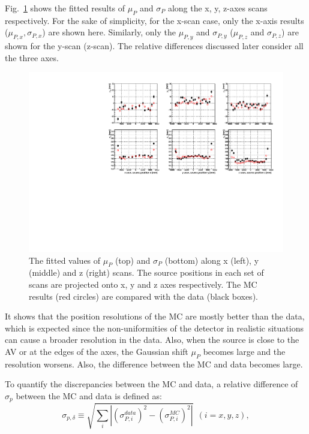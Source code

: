 Fig.~\ref{MPWscanXYZResols} shows the fitted results of $\mu_P$ and $\sigma_P$ along the x, y, z-axes scans respectively. For the sake of simplicity, for the x-scan case, only the x-axis results ($\mu_{P,x},\sigma_{P,x}$) are shown here. Similarly, only the $\mu_{P,y}$ and $\sigma_{P,y}$ ($\mu_{P,z}$ and $\sigma_{P,z}$) are shown for the y-scan (z-scan). The relative differences discussed later consider all the three axes.

\begin{figure}
	\centering
	\includegraphics[width=16cm]{N16_rat6176_muPandSigmaP_xyzScans.pdf}
	\caption[The fitted values of $\mu_P$ and $\sigma_P$ along x, y and z scans.]{The fitted values of $\mu_P$ (top) and $\sigma_P$ (bottom) along x (left), y (middle) and z (right) scans. The source positions in each set of scans are projected onto x, y and z axes respectively. The MC results (red circles) are compared with the data (black boxes).}
	\label{MPWscanXYZResols}
\end{figure}

It shows that the position resolutions of the MC are mostly better than the data, which is expected since the non-uniformities of the detector in realistic situations can cause a broader resolution in the data\cite{waterunidoc}. Also, when the source is close to the AV or at the edges of the axes, the Gaussian shift $\mu_P$ becomes large and the resolution worsens. Also, the difference between the MC and data becomes large.

To quantify the discrepancies between the MC and data, a relative difference of $\sigma_p$ between the MC and data is defined as\cite{waterunidoc}:
\begin{equation}
\sigma_{p,\delta}\equiv\sqrt{\sum_i|(\sigma^{data}_{P,i})^2-(\sigma^{MC}_{P,i})^2|}~~(i=x,y,z),
\end{equation}
 
